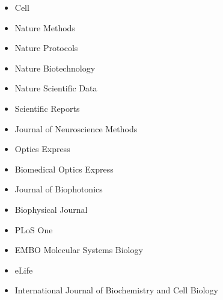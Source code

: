 \begin{itemize}
\item Cell
\item Nature Methods
\item Nature Protocols
\item Nature Biotechnology
\item Nature Scientific Data
\item Scientific Reports
\item Journal of Neuroscience Methods
\item Optics Express
\item Biomedical Optics Express
\item Journal of Biophotonics
\item Biophysical Journal
\item PLoS One
\item EMBO Molecular Systems Biology 
\item eLife
\item International Journal of Biochemistry and Cell Biology
\end{itemize}